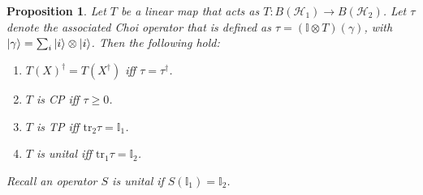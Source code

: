 \documentclass[10pt,oneside,longbibliography]{report}
\newtheorem{proposition}{Proposition}[section]
\begin{document}
\begin{proposition}
Let $T$ be a linear map that acts as $T: B(\mathcal{H}_1)\rightarrow B(\mathcal{H}_2)$. Let $\tau$ denote the associated Choi operator that is defined as $\tau =(\mathbb{I} \otimes T)(\gamma)$, with $\ket{\gamma} = \sum_i \ket{i}\otimes \ket{i}$. Then the following hold:
\begin{enumerate}
    \item $T(X)^{\dagger}=T(X^{\dagger})$ iff $\tau=\tau^{\dagger}$.
    \item $T$ is CP iff $\tau \geq 0$.
    \item $T$ is TP iff $\text{tr}_2 \tau=\mathbb{I}_1$.
    \item $T$ is unital iff $\text{tr}_1 \tau = \mathbb{I}_2$.
\end{enumerate}
Recall an operator $S$ is unital if $S(\mathbb{I}_1)=\mathbb{I}_2$.
\end{proposition}
\end{document}
